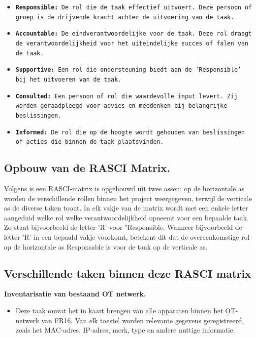 \begin{itemize}
    \item \texttt{\textbf{Responsible:} De rol die de taak effectief uitvoert. Deze persoon of groep is de drijvende kracht achter de uitvoering van de taak. }
    \item \texttt{\textbf{Accountable:} De eindverantwoordelijke voor de taak. Deze rol draagt de verantwoordelijkheid voor het uiteindelijke succes of falen van de taak. }
    \item \texttt{\textbf{Supportive:} Een rol die ondersteuning biedt aan de 'Responsible' bij het uitvoeren van de taak. }
    \item \texttt{\textbf{Consulted:} Een persoon of rol die waardevolle input levert. Zij worden geraadpleegd voor advies en meedenken bij belangrijke beslissingen.}
    \item \texttt{\textbf{Informed:} De rol die op de hoogte wordt gehouden van beslissingen of acties die binnen de taak plaatsvinden.}
\end{itemize}

\subsection{Opbouw van de RASCI Matrix.}
Volgens \textcite{Cabanillas2011} is een RASCI-matrix is opgebouwd uit twee assen: op de horizontale as worden de verschillende rollen binnen het project weergegeven, terwijl de verticale as de diverse taken toont. In elk vakje van de matrix wordt met een enkele letter aangeduid welke rol welke verantwoordelijkheid opneemt voor een bepaalde taak. Zo staat bijvoorbeeld de letter 'R' voor "Responsible. Wanneer bijvoorbeeld de letter 'R' in een bepaald vakje voorkomt, betekent dit dat de overeenkomstige rol op de horizontale as Responsable is voor de taak op de verticale as. \autocite{Cabanillas2011}

\subsection{Verschillende taken binnen deze RASCI matrix}
\textbf{Inventarisatie van bestaand OT netwerk.}
\begin{itemize}[label=\textbullet]
    \item Deze taak omvat het in kaart brengen van alle apparaten binnen het OT-netwerk van FR16. Van elk toestel worden relevante gegevens geregistreerd, zoals het MAC-adres, IP-adres, merk, type en andere nuttige informatie.  
\end{itemize}

